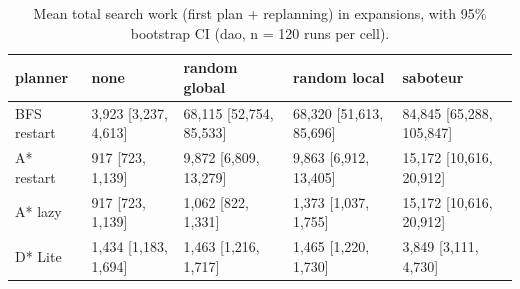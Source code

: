 \begin{table}[t]
\centering
\small
\caption{Mean total search work (first plan + replanning) in expansions, with 95\% bootstrap CI (dao, n = 120 runs per cell).}
\label{tab:total-dao}
\begin{tabular}{lllll}
\toprule
planner & none & random global & random local & saboteur \\
\midrule
BFS restart & 3,923 [3,237, 4,613] & 68,115 [52,754, 85,533] & 68,320 [51,613, 85,696] & 84,845 [65,288, 105,847] \\
A* restart & 917 [723, 1,139] & 9,872 [6,809, 13,279] & 9,863 [6,912, 13,405] & 15,172 [10,616, 20,912] \\
A* lazy & 917 [723, 1,139] & 1,062 [822, 1,331] & 1,373 [1,037, 1,755] & 15,172 [10,616, 20,912] \\
D* Lite & 1,434 [1,183, 1,694] & 1,463 [1,216, 1,717] & 1,465 [1,220, 1,730] & 3,849 [3,111, 4,730] \\
\bottomrule
\end{tabular}
\end{table}
